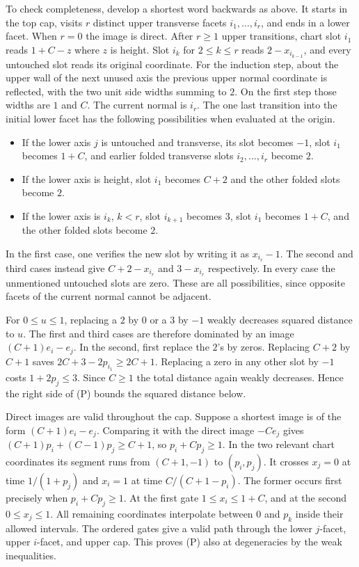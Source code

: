 \documentclass[10pt,letterpaper]{article}
\begin{document}
To check completeness, develop a shortest word backwards as above. It
starts in the top cap, visits $r$ distinct upper transverse facets
$i_1,\ldots,i_r$, and ends in a lower facet. When $r=0$ the image is direct.
After $r\ge1$ upper transitions, chart slot $i_1$ reads $1+C-z$ where $z$
is height. Slot $i_k$ for $2\le k\le r$ reads $2-x_{i_{k-1}}$, and every
untouched slot reads its original coordinate. For the induction step, about the upper wall of the next unused axis the previous upper normal
coordinate is reflected, with the two unit side widths summing to $2$. On the first step those widths are $1$ and $C$. The current normal is
$i_r$. The one last transition into the initial lower facet has the
following possibilities when evaluated at the origin.
\begin{itemize}
\item If the lower axis $j$ is untouched and transverse, its slot becomes
$-1$, slot $i_1$ becomes $1+C$, and earlier folded transverse slots $i_2,
\ldots,i_r$ become $2$.
\item If the lower axis is height, slot $i_1$ becomes $C+2$ and the
other folded slots become $2$.
\item If the lower axis is $i_k$, $k<r$, slot $i_{k+1}$ becomes $3$,
slot $i_1$ becomes $1+C$, and the other folded slots become $2$.
\end{itemize}
In the first case, one verifies the new slot by writing it as
$x_{i_r}-1$. The second and third cases instead give $C+2-x_{i_r}$ and
$3-x_{i_r}$ respectively. In every case the unmentioned untouched slots are zero.
These are all possibilities, since opposite facets of the current normal
cannot be adjacent.

For $0\le u\le1$, replacing a $2$ by $0$ or a $3$ by $-1$ weakly
decreases squared distance to $u$. The first and third cases are therefore
dominated by an image $(C+1)e_i-e_j$. In the second, first replace
the $2$'s by zeros. Replacing $C+2$ by $C+1$ saves
$2C+3-2p_{i_1}\ge2C+1$. Replacing a zero in any other slot by $-1$
costs $1+2p_j\le3$. Since $C\ge1$ the total distance again weakly
decreases. Hence the right side of (P) bounds the squared distance below.

Direct images are valid throughout the cap. Suppose a shortest image
is of the form $(C+1)e_i-e_j$. Comparing it with the direct image
$-C e_j$ gives $(C+1)p_i+(C-1)p_j\ge C+1$, so $p_i+C p_j\ge1$.
In the two relevant chart coordinates its segment runs from
$(C+1,-1)$ to $(p_i,p_j)$. It crosses $x_j=0$ at time
$1/(1+p_j)$ and $x_i=1$ at time $C/(C+1-p_i)$. The former occurs first
precisely when $p_i+C p_j\ge1$. At the first gate $1\le x_i\le1+C$,
and at the second $0\le x_j\le1$. All remaining coordinates interpolate
between $0$ and $p_k$ inside their allowed intervals. The ordered gates
give a valid path through the lower $j$-facet, upper $i$-facet, and
upper cap. This proves (P) also at degeneracies by the weak inequalities.
\end{document}
